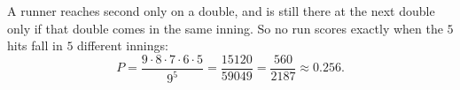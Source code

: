 A runner reaches second only on a double, and is still there at the next double only if that double comes in the same inning. So no run scores exactly when the $5$ hits fall in $5$ different innings:
\[P=\dfrac{9\cdot8\cdot7\cdot6\cdot5}{9^5}=\dfrac{15120}{59049}=\boxed{\dfrac{560}{2187}}\approx0.256.\]
